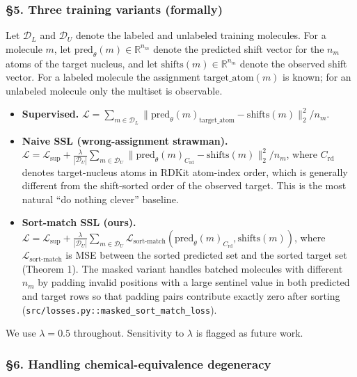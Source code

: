 \documentclass[
]{article}
\begin{document}
\subsubsection{§5. Three training variants
(formally)}\label{three-training-variants-formally}

Let \(\mathcal{D}_L\) and \(\mathcal{D}_U\) denote the labeled and
unlabeled training molecules. For a molecule \(m\), let
\(\text{pred}_\theta(m)\in\mathbb{R}^{n_m}\) denote the predicted shift
vector for the \(n_m\) atoms of the target nucleus, and let
\(\text{shifts}(m)\in\mathbb{R}^{n_m}\) denote the observed shift
vector. For a labeled molecule the assignment \(\text{target\_atom}(m)\)
is known; for an unlabeled molecule only the multiset is observable.

\begin{itemize}
\item
  \textbf{Supervised.}
  \(\mathcal{L}=\sum_{m\in\mathcal{D}_L}\|\text{pred}_\theta(m)_{\text{target\_atom}}-\text{shifts}(m)\|_2^2/n_m.\)
\item
  \textbf{Naive SSL (wrong-assignment strawman).}
  \(\mathcal{L}=\mathcal{L}_{\text{sup}}+\frac{\lambda}{|\mathcal{D}_U|}\sum_{m\in\mathcal{D}_U}\|\text{pred}_\theta(m)_{C_{\text{rd}}}-\text{shifts}(m)\|_2^2/n_m\),
  where \(C_{\text{rd}}\) denotes target-nucleus atoms in RDKit
  atom-index order, which is generally different from the shift-sorted
  order of the observed target. This is the most natural ``do nothing
  clever'' baseline.
\item
  \textbf{Sort-match SSL (ours).}
  \(\mathcal{L}=\mathcal{L}_{\text{sup}}+\frac{\lambda}{|\mathcal{D}_U|}\sum_{m\in\mathcal{D}_U}\mathcal{L}_{\text{sort-match}}(\text{pred}_\theta(m)_{C_{\text{rd}}},\text{shifts}(m))\),
  where \(\mathcal{L}_{\text{sort-match}}\) is MSE between the sorted
  predicted set and the sorted target set (Theorem 1). The masked
  variant handles batched molecules with different \(n_m\) by padding
  invalid positions with a large sentinel value in both predicted and
  target rows so that padding pairs contribute exactly zero after
  sorting (\texttt{src/losses.py::masked\_sort\_match\_loss}).
\end{itemize}

We use \(\lambda=0.5\) throughout. Sensitivity to \(\lambda\) is flagged
as future work.

\subsubsection{§6. Handling chemical-equivalence
degeneracy}\label{handling-chemical-equivalence-degeneracy}
\end{document}
